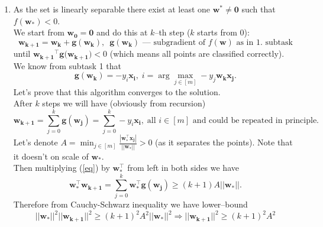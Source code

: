 \documentclass[]{article}
\begin{document}
\begin{enumerate}
	\item As the set is linearly separable there exist at least one $\mathbf{w^*}\ne\mathbf{0}$ such that $f(\mathbf{w_*}) <0$.\\
	We start from $\mathbf{w_0}=\mathbf{0}$ and do this at $k$--th step ($k$ starts from $0$):
	$$\mathbf{w_{k+1}} = \mathbf{w_k} + \mathbf{g}(\mathbf{w_k}), \:\; \mathbf{g}(\mathbf{w_k}) \text{ --- subgradient of $f(\mathbf{w})$ as in 1. subtask}$$
	until $\mathbf{w_{k+1}}^\top\mathbf{g}(\mathbf{w_{k+1})}<0$ (which means all points are classified correctly). 
	We know from subtask 1 that
	$$\mathbf{g}(\mathbf{w_k})=-y_i\mathbf{x_i},\; i=\arg\max_{j\in [m]} -y_j\mathbf{w_k}\mathbf{x_j}.$$
	Let's prove that this algorithm converges to the solution.\\
	After $k$ steps we will have (obviously from recursion)
	\begin{equation}
	\label{eq}
	\mathbf{w_{k+1}} = \sum_{j=0}^{k}\mathbf{g}(\mathbf{w_j})=\sum_{j=0}^{k} -y_i\mathbf{x_i}, \; \text{all $i\in [m]$ and could be repeated in principle.}
	\end{equation}
	Let's denote $A=\min_{j\in [m]}\frac{|\mathbf{w_*^\top} \mathbf{x_j}|}{||\mathbf{w_*}||}>0$ (as it separates the points). Note that it doesn't on scale of $\mathbf{w_*}$.\\
	Then multiplying (\ref{eq}) by $\mathbf{w_*^\top}$ from left in both sides we have
	$$\mathbf{w_*^\top}\mathbf{w_{k+1}} = \sum_{j=0}^{k} \mathbf{w_*^\top}\mathbf{g}(\mathbf{w_j})\ge (k+1)A||\mathbf{w_*}||.$$
	Therefore from Cauchy-Schwarz inequality we have lower--bound
	\begin{equation}
	\label{low}
	||\mathbf{w_*}||^2||\mathbf{w_{k+1}}||^2 \ge (k+1)^2A^2||\mathbf{w_*}||^2 \Rightarrow ||\mathbf{w_{k+1}}||^2 \ge (k+1)^2A^2
	\end{equation}
	

\end{enumerate}
\end{document}
